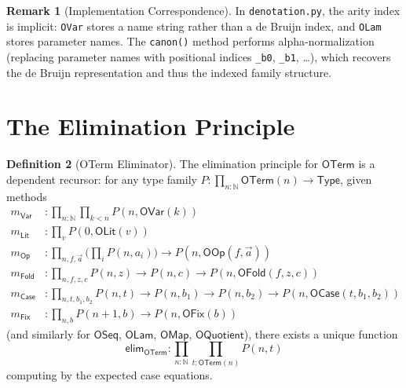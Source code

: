 \documentclass[11pt,a4paper]{report}
\theoremstyle{definition}
\newtheorem{definition}{Definition}[chapter]
\newtheorem{remark}[definition]{Remark}
\theoremstyle{plain}
\newcommand{\Nat}{\mathbb{N}}
\newcommand{\Type}{\mathsf{Type}}
\newcommand{\elim}{\mathsf{elim}}
\begin{document}
\begin{remark}[Implementation Correspondence]
In \texttt{denotation.py}, the arity index is implicit: \texttt{OVar}
stores a name string rather than a de Bruijn index, and \texttt{OLam}
stores parameter names.  The \texttt{canon()} method performs
alpha-normalization (replacing parameter names with positional
indices \texttt{\_b0}, \texttt{\_b1}, \ldots), which recovers the
de Bruijn representation and thus the indexed family structure.
\end{remark}

\section{The Elimination Principle}

\begin{definition}[OTerm Eliminator]
\label{def:oterm-elim}
The elimination principle for $\mathsf{OTerm}$ is a dependent
recursor: for any type family $P : \prod_{n:\Nat}
\mathsf{OTerm}(n) \to \Type$, given methods
\begin{align}
  m_{\mathsf{Var}} &: \prod_{n:\Nat}\prod_{k < n} P(n, \mathsf{OVar}(k)) \\
  m_{\mathsf{Lit}} &: \prod_{v} P(0, \mathsf{OLit}(v)) \\
  m_{\mathsf{Op}} &: \prod_{n,f,\vec{a}}
    \bigl(\prod_i P(n, a_i)\bigr) \to P(n, \mathsf{OOp}(f,\vec{a})) \\
  m_{\mathsf{Fold}} &: \prod_{n,f,z,c}
    P(n,z) \to P(n,c) \to P(n, \mathsf{OFold}(f,z,c)) \\
  m_{\mathsf{Case}} &: \prod_{n,t,b_1,b_2}
    P(n,t) \to P(n,b_1) \to P(n,b_2) \to P(n, \mathsf{OCase}(t,b_1,b_2)) \\
  m_{\mathsf{Fix}} &: \prod_{n,b}
    P(n{+}1, b) \to P(n, \mathsf{OFix}(b))
\end{align}
(and similarly for $\mathsf{OSeq}$, $\mathsf{OLam}$, $\mathsf{OMap}$,
$\mathsf{OQuotient}$), there exists a unique function
\[
  \elim_{\mathsf{OTerm}} : \prod_{n:\Nat}\prod_{t:\mathsf{OTerm}(n)}
    P(n, t)
\]
computing by the expected case equations.
\end{definition}
\end{document}
